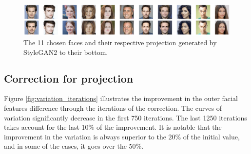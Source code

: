 \documentclass[review]{elsarticle}
\begin{document}
\begin{figure}[H]
  \includegraphics[width=\linewidth, center]{Images/faces_with_projection.png}
  \caption{The 11 chosen faces and their respective projection generated by StyleGAN2 to their bottom.}
  \label{fig:projections}
\end{figure}

\subsection{Correction for projection}

Figure \ref{fig:variation_iterations} illustrates the improvement in the outer facial features difference through the iterations of the correction. The curves of variation significantly decrease in the first 750 iterations. The last 1250 iterations takes account for the last 10\% of the improvement. It is notable that the improvement in the variation is always superior to the 20\% of the initial value, and in some of the cases, it goes over the 50\%. 
\end{document}
